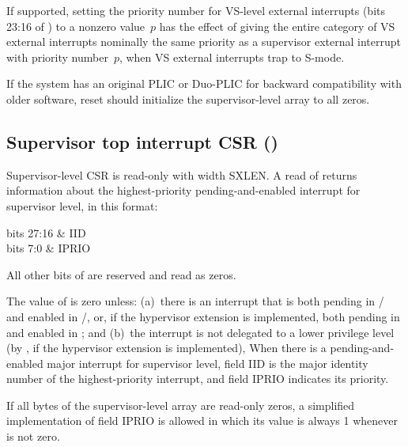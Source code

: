 If supported, setting the priority number for VS-level external
interrupts (bits 23:16 of ) to a nonzero value~$p$ has
the effect of giving the entire category of VS external interrupts
nominally the same priority as a supervisor external interrupt with
priority number~$p$, when VS external interrupts trap to \mbox{S-mode}.

If the system has an original PLIC or \mbox{Duo-PLIC} for backward
compatibility with older software, reset should initialize the
supervisor-level  array to all zeros.

\subsection{Supervisor top interrupt CSR ()}
\label{sec:stopi}

Supervisor-level CSR  is read-only with width SXLEN.
A read of  returns information about the highest-priority
pending-and-enabled interrupt for supervisor level, in this
format:\nopagebreak
\begin{displayLinesTable}[l@{\quad}l]
bits 27:16 & IID \\
bits 7:0   & IPRIO \\
\end{displayLinesTable}
All other bits of  are reserved and read as zeros.

The value of  is zero unless:
(a)~there is an interrupt that is both pending in /
and enabled in /, or, if the hypervisor extension is
implemented, both pending in  and enabled in ; and
(b)~the interrupt is not delegated to a lower privilege level
(by , if the hypervisor extension is implemented),
When there is a pending-and-enabled major interrupt for supervisor
level, field IID is the major identity number of the highest-priority
interrupt, and field IPRIO indicates its priority.

If all bytes of the supervisor-level  array are read-only
zeros, a simplified implementation of field IPRIO is allowed in which
its value is always 1 whenever  is not zero.

